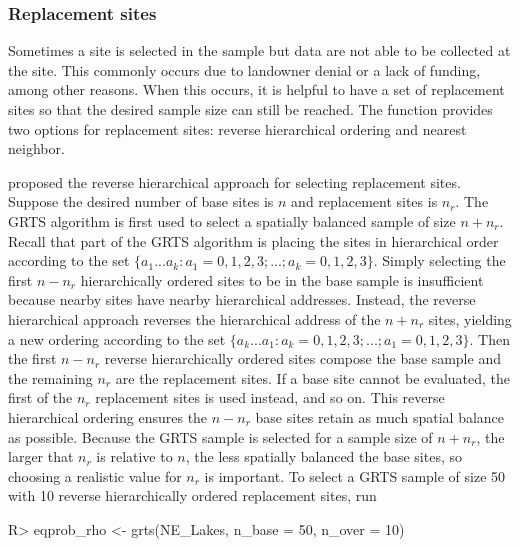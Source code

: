 \documentclass[
  shortnames]{jss}
\begin{document}
\hypertarget{subsubsec:repl_sites}{%
\subsubsection{Replacement sites}\label{subsubsec:repl_sites}}

Sometimes a site is selected in the sample but data are not able to be
collected at the site. This commonly occurs due to landowner denial or a
lack of funding, among other reasons. When this occurs, it is helpful to
have a set of replacement sites so that the desired sample size can
still be reached. The  function provides two options for
replacement sites: reverse hierarchical ordering and nearest neighbor.

\citet{stevens2004grts} proposed the reverse hierarchical approach for
selecting replacement sites. Suppose the desired number of base sites is
\(n\) and replacement sites is \(n_r\). The GRTS algorithm is first used
to select a spatially balanced sample of size \(n + n_r\). Recall that
part of the GRTS algorithm is placing the sites in hierarchical order
according to the set
\(\{a_1...a_k : a_1 = 0, 1, 2, 3; ...; a_k = 0, 1, 2, 3\}\). Simply
selecting the first \(n - n_r\) hierarchically ordered sites to be in
the base sample is insufficient because nearby sites have nearby
hierarchical addresses. Instead, the reverse hierarchical approach
reverses the hierarchical address of the \(n + n_r\) sites, yielding a
new ordering according to the set
\(\{a_k...a_1 : a_k = 0, 1, 2, 3; ...; a_1 = 0, 1, 2, 3\}\). Then the
first \(n - n_r\) reverse hierarchically ordered sites compose the base
sample and the remaining \(n_r\) are the replacement sites. If a base
site cannot be evaluated, the first of the \(n_r\) replacement sites is
used instead, and so on. This reverse hierarchical ordering ensures the
\(n - n_r\) base sites retain as much spatial balance as possible.
Because the GRTS sample is selected for a sample size of \(n + n_r\),
the larger that \(n_r\) is relative to \(n\), the less spatially
balanced the base sites, so choosing a realistic value for \(n_r\) is
important. To select a GRTS sample of size 50 with 10 reverse
hierarchically ordered replacement sites, run

\begin{CodeChunk}
\begin{CodeInput}
R> eqprob_rho <- grts(NE_Lakes, n_base = 50, n_over = 10)
\end{CodeInput}
\end{CodeChunk}
\end{document}
